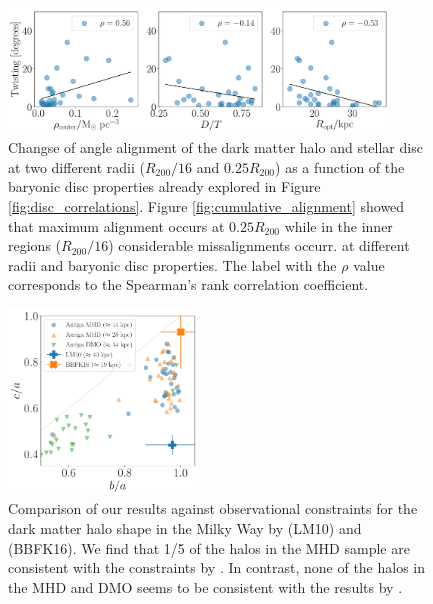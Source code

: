 \documentclass[usenatbib]{mnras}
\begin{document}
\begin{figure}
\begin{center}
\includegraphics[width=0.9\textwidth]{correlations_angles_alignment_MHD.pdf}
\end{center}
\caption{Changse of angle alignment of the dark
  matter halo and stellar disc at two different radii ($R_{200}/16$
  and $0.25R_{200}$) as a function of the baryonic disc properties
  already explored in Figure \ref{fig:disc_correlations}.  
  Figure \ref{fig:cumulative_alignment} showed that maximum alignment
  occurs at $0.25R_{200}$ while in the inner regions ($R_{200}/16$)
  considerable missalignments occurr.
 at different radii
 and baryonic disc properties. 
 The label with the $\rho$ value corresponds to the Spearman’s rank correlation coefficient. }
\label{fig:alignment_correlations}
\end{figure}



\begin{figure}
\begin{center}
\includegraphics[width=0.45\textwidth]{triaxiality_observations.pdf}
\end{center}
\caption{Comparison of our results against 
observational constraints for the 
dark matter halo shape in the Milky Way by \citet{LM10} (LM10) and
\citet{Bovy16} (BBFK16).   
We find that  1/5 of the halos in the MHD  sample are consistent with
the constraints by \citet{Bovy16}.
In contrast, none of the halos in the MHD and DMO seems to be
consistent with the results by \citet{LM10}.}
\label{fig:observations}
\end{figure}
\end{document}
